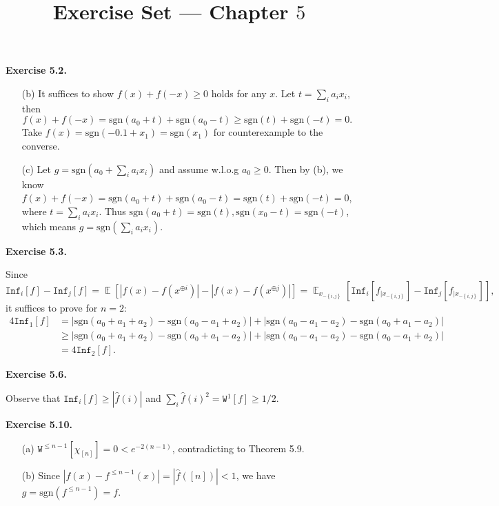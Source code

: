 \documentclass[a4paper]{article}
\title{Exercise Set --- Chapter $5$}
\date{}
\newenvironment{exercise}[1]{
	\par
	\noindent\textbf{Exercise #1.}\quad
}{
	\par
	\bigskip
}
\DeclareMathOperator*{\E}{\mathbb E}
\newcommand{\abs}[1]{{\left| #1 \right|}}
\newcommand{\cbra}[1]{{\left\{ #1 \right\}}}
\newcommand{\sbra}[1]{{\left[ #1 \right]}}
\newcommand{\sgn}{\text{sgn}}
\newcommand{\Inf}{\mathtt{Inf}}
\newcommand{\Wtt}{\mathtt{W}}
\begin{document}
\maketitle

\begin{exercise}{5.2}
    \begin{itemize}
        \item[(b)] It suffices to show $f(x)+f(-x)\geq0$ holds for any $x$. Let $t=\sum_ia_ix_i$, then 
            $$
            f(x)+f(-x)=\sgn(a_0+t)+\sgn(a_0-t)\geq\sgn(t)+\sgn(-t)=0.
            $$
            Take $f(x)=\sgn(-0.1+x_1)=\sgn(x_1)$ for counterexample to the converse.
        \item[(c)] Let $g=\sgn(a_0+\sum_ia_ix_i)$ and assume w.l.o.g $a_0\geq0$. Then by (b), we know
            $f(x)+f(-x)=\sgn(a_0+t)+\sgn(a_0-t)=\sgn(t)+\sgn(-t)=0$, where $t=\sum_ia_ix_i$.
            Thus $\sgn(a_0+t)=\sgn(t),\sgn(x_0-t)=\sgn(-t)$, which means $g=\sgn(\sum_ia_ix_i)$.
    \end{itemize}
\end{exercise}

\begin{exercise}{5.3}
    Since
    $$
    \Inf_i[f]-\Inf_j[f]=\E\sbra{\abs{f(x)-f(x^{\oplus i})}-\abs{f(x)-f(x^{\oplus j})}}
    =\E_{x_{-\cbra{i,j}}}\sbra{\Inf_i\sbra{f_{|{x_{-\cbra{i,j}}}}}-\Inf_j\sbra{f_{|{x_{-\cbra{i,j}}}}}},
    $$
    it suffices to prove for $n=2$:
    \begin{align*}
    4\Inf_1[f]
        &=\abs{\sgn(a_0+a_1+a_2)-\sgn(a_0-a_1+a_2)}+\abs{\sgn(a_0-a_1-a_2)-\sgn(a_0+a_1-a_2)}\\
        &\geq\abs{\sgn(a_0+a_1+a_2)-\sgn(a_0+a_1-a_2)}+\abs{\sgn(a_0-a_1-a_2)-\sgn(a_0-a_1+a_2)}\\
        &=4\Inf_2[f].
    \end{align*}
\end{exercise}

\begin{exercise}{5.6}
    Observe that $\Inf_i[f]\geq\abs{\hat f(i)}$ and $\sum_i\hat f(i)^2=\Wtt^1[f]\geq1/2$.
\end{exercise}

\begin{exercise}{5.10}
    \begin{itemize}
        \item[(a)] $\Wtt^{\leq n-1}\sbra{\chi_{[n]}}=0<e^{-2(n-1)}$, contradicting to Theorem 5.9.
        \item[(b)] Since $\abs{f(x)-f^{\leq n-1}(x)}=\abs{\hat f([n])}<1$, we have $g=\sgn(f^{\leq n-1})=f$.
    \end{itemize}
\end{exercise}
\end{document}
